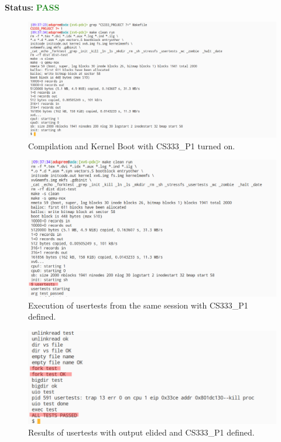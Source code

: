 \documentclass[11pt,letterpaper]{report}
\begin{document}
{  \noindent\textbf{Status:} \textcolor{ForestGreen}{\textbf{PASS}}
  
  \begin{figure}[h!]
	\centering
	\includegraphics[width=1\linewidth]{test4.png}
	\caption[PRINT\_SYSCALLS=0]{Compilation and Kernel Boot with CS333\_P1 turned on.}
	\label{fig:P1compileP0-1}
  \end{figure}

  \begin{figure}[h!]
	\centering
	\includegraphics[width=1\linewidth]{test4-cont.png}
	\caption[PRINT\_SYSCALLS=0]{Execution of usertests from the same session with CS333\_P1 defined.}
	\label{fig:P1compileP0-1}
  \end{figure}

  \begin{figure}[h!]
	\centering
	\includegraphics[width=1\linewidth]{test4-cont2.png}
	\caption[PRINT\_SYSCALLS=0]{Results of usertests with output elided and CS333\_P1 defined.}
	\label{fig:P1compileP0-1}
  \end{figure}

}
\end{document}
